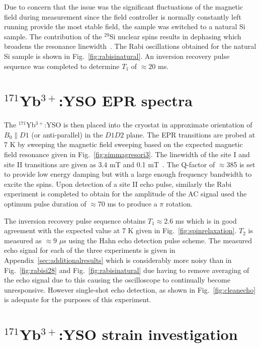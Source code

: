 Due to concern that the issue was the significant fluctuations of the magnetic field during measurement since the field controller is normally constantly left running provide the most stable field, the sample was switched to a natural Si sample. The contribution of the $^{29}$Si nuclear spins results in dephasing which broadens the resonance linewidth~\citep{Hileeaaq1459}. The Rabi oscillations obtained for the natural Si sample is shown in Fig.~\ref{fig:rabisinatural}. An inversion recovery pulse sequence was completed to determine $T_{1}$ of $\approx 20$ ms.    

\section{$^{171}$Yb$^{3+}$:YSO EPR spectra}
The $^{171}$Yb$^{3+}$:YSO is then placed into the cryostat in approximate orientation of $B_{0}\parallel D1$ (or anti-parallel) in the $D1D2$ plane. The EPR transitions are probed at 7 K by sweeping the magnetic field sweeping based on the expected magnetic field resonance given in Fig.~\ref{fig:simmagresori3}. The linewidth of the site I and site II transitions are given as 3.4 mT and 0.1 mT~\citep{PhysRevB.97.064409}. The Q-factor of $\approx$385 is set to provide low energy damping but with a large enough frequency bandwidth to excite the spins. Upon detection of a site II echo pulse, similarly the Rabi experiment is completed to obtain for the amplitude of the AC signal used the optimum pulse duration of $\approx$70 ms to produce a $\pi$ rotation. 

The inversion recovery pulse sequence obtains $T_{1}\approx$2.6 ms which is in good agreement with the expected value at 7 K given in Fig.~\ref{fig:spinrelaxation}. $T_{2}$ is measured as $\approx 9$ $\mu$s using the Hahn echo detection pulse scheme. The measured echo signal for each of the three experiments is given in Appendix~\ref{sec:additionalresults} which is considerably more noisy than in Fig.~\ref{fig:rabisi28} and Fig.~\ref{fig:rabisinatural} due having to remove averaging of the echo signal due to this causing the oscilloscope to continually become unresponsive. However single-shot echo detection, as shown in Fig.~\ref{fig:cleanecho} is adequate for the purposes of this experiment. 

\section{\label{sec:strainexp}$^{171}$Yb$^{3+}$:YSO strain investigation}

